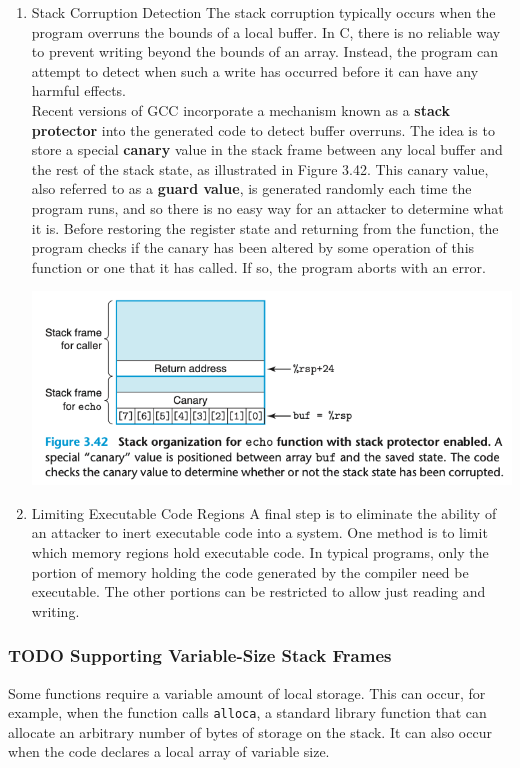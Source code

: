 \documentclass[11pt]{article}
\begin{document}
\begin{enumerate}
\item Stack Corruption Detection
\label{sec:org9a77b9e}
The stack corruption typically occurs when the program overruns the bounds of a local buffer. In C, there is no reliable way to prevent writing beyond the bounds of an array. Instead, the program can attempt to detect when such a write has occurred before it can have any harmful effects.\\

Recent versions of GCC incorporate a mechanism known as a \textbf{stack protector} into the generated code to detect buffer overruns. The idea is to store a special \textbf{canary} value in the stack frame between any local buffer and the rest of the stack state, as illustrated in Figure 3.42. This canary value, also referred to as a \textbf{guard value}, is generated randomly each time the program runs, and so there is no easy way for an attacker to determine what it is. Before restoring the register state and returning from the function, the program checks if the canary has been altered by some operation of this function or one that it has called. If so, the program aborts with an error.\\

\begin{center}
\includegraphics[width=.9\linewidth]{pics/stack-protector.png}
\end{center}

\item Limiting Executable Code Regions
\label{sec:orgbef5807}
A final step is to eliminate the ability of an attacker to inert executable code into a system. One method is to limit which memory regions hold executable code. In typical programs, only the portion of memory holding the code generated by the compiler need be executable. The other portions can be restricted to allow just reading and writing.\\
\end{enumerate}

\subsubsection{{\bfseries\sffamily TODO} Supporting Variable-Size Stack Frames}
\label{sec:orgb559b2f}
Some functions require a variable amount of local storage. This can occur, for example, when the function calls \texttt{alloca}, a standard library function that can allocate an arbitrary number of bytes of storage on the stack. It can also occur when the code declares a local array of variable size.\\
\end{document}
